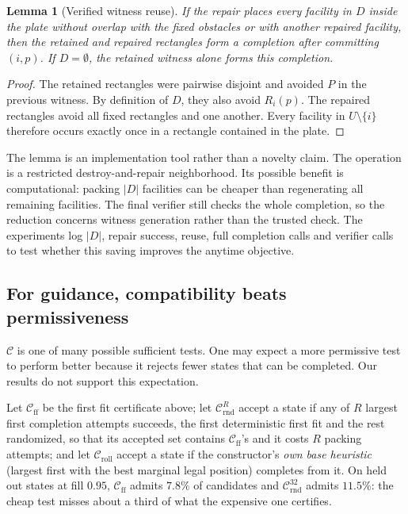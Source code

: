 \documentclass[preprint,12pt,authoryear]{elsarticle}
\newtheorem{lem}{Lemma}
\newcommand{\cC}{\mathcal{C}}
\newif\iflegacydetails
\begin{document}
\begin{lem}[Verified witness reuse]
\label{lem:repair}
If the repair places every facility in $D$ inside the plate without overlap
with the fixed obstacles or with another repaired facility, then the retained
and repaired rectangles form a completion after committing $(i,p)$. If
$D=\emptyset$, the retained witness alone forms this completion.
\end{lem}
\begin{proof}
The retained rectangles were pairwise disjoint and avoided $P$ in the previous
witness. By definition of $D$, they also avoid $R_i(p)$. The repaired rectangles
avoid all fixed rectangles and one another. Every facility in $U\setminus\{i\}$
therefore occurs exactly once in a rectangle contained in the plate.
\end{proof}

The lemma is an implementation tool rather than a novelty claim. The operation
is a restricted destroy-and-repair neighborhood. Its possible benefit is
computational: packing $|D|$ facilities can be cheaper than regenerating all
remaining facilities. The final verifier still checks the whole completion, so
the reduction concerns witness generation rather than the trusted check. The
experiments log $|D|$, repair success, reuse, full completion calls and verifier
calls to test whether this saving improves the anytime objective.

\iflegacydetails
\subsection{For guidance, compatibility beats permissiveness}
\label{sec:which_cert}

$\cC$ is one of many possible sufficient tests. One may expect a more permissive
test to perform better because it rejects fewer states that can be completed.
Our results do not support this expectation.

Let $\cC_{\mathrm{ff}}$ be the first fit certificate above; let
$\cC_{\mathrm{rnd}}^{R}$ accept a state if any of $R$ largest first completion
attempts succeeds, the first deterministic first fit and the rest randomized,
so that its accepted set contains $\cC_{\mathrm{ff}}$'s and it costs $R$
packing attempts; and let $\cC_{\mathrm{roll}}$ accept a state if the constructor's
\emph{own base heuristic} (largest first with the best marginal legal position)
completes from it. On held out states at fill $0.95$, $\cC_{\mathrm{ff}}$
admits $7.8\%$ of candidates and $\cC_{\mathrm{rnd}}^{32}$ admits $11.5\%$: the
cheap test misses about a third of what the expensive one certifies.
\end{document}

